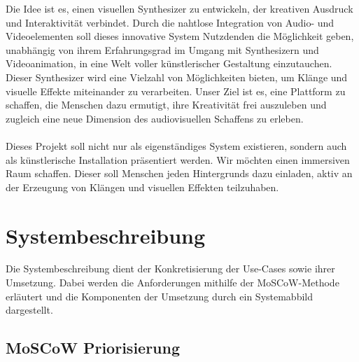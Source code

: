 \documentclass[12pt]{scrartcl}%
\theoremstyle{nonumberplain}
\begin{document}
\noindent Die Idee ist es, einen visuellen Synthesizer zu entwickeln, der kreativen Ausdruck und Interaktivität verbindet. Durch die nahtlose Integration von Audio- und Videoelementen soll dieses innovative System Nutzdenden die Möglichkeit geben, unabhängig von ihrem Erfahrungsgrad im Umgang mit Synthesizern und Videoanimation, in eine Welt voller künstlerischer Gestaltung einzutauchen. Dieser Synthesizer wird eine Vielzahl von Möglichkeiten bieten, um Klänge und visuelle Effekte miteinander zu verarbeiten. Unser Ziel ist es, eine Plattform zu schaffen, die Menschen dazu ermutigt, ihre Kreativität frei auszuleben und zugleich eine neue Dimension des audiovisuellen Schaffens zu erleben.\\\\
Dieses Projekt soll nicht nur als eigenständiges System existieren, sondern auch als künstlerische Installation präsentiert werden. Wir möchten einen immersiven Raum schaffen. Dieser soll Menschen jeden Hintergrunds dazu einladen, aktiv an der Erzeugung von Klängen und visuellen Effekten teilzuhaben.

\section{Systembeschreibung}

Die Systembeschreibung dient der Konkretisierung der Use-Cases sowie ihrer Umsetzung. Dabei werden die Anforderungen mithilfe der MoSCoW-Methode erläutert und die Komponenten der Umsetzung durch ein Systemabbild dargestellt.

\subsection{MoSCoW Priorisierung}
\end{document}
